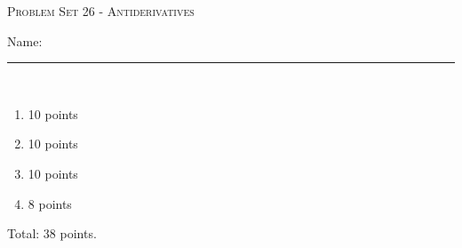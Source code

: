\documentclass{article}
\begin{document}
\begin{center}
  \large\textsc{Problem Set 26 - Antiderivatives}
  
      \pspace{12pt}
  \begin{problemonly}\large Name: \rule{5cm}{0.15mm}\\ \end{problemonly}
\end{center}

\begin{grading}
\begin{enumerate}
    \item 10 points
    \item 10 points
    \item 10 points
    \item 8 points
  
\end{enumerate}
Total: 38 points.
\end{grading}
\end{document}
